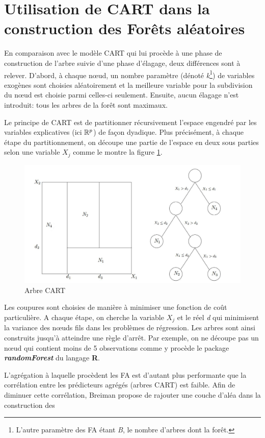 \section{Utilisation de CART dans la construction des Forêts aléatoires}
En comparaison avec le modèle CART qui lui procède à une phase de construction de l'arbre suivie d'une phase d'élagage, deux différences sont à relever. D'abord, à chaque nœud, un nombre paramètre (dénoté \textit{k}\footnote{L'autre paramètre des FA étant \textit{B}, le nombre d'arbres dont la forêt.}) de variables exogènes sont choisies aléatoirement et la meilleure variable pour la subdivision du nœud est choisie parmi celles-ci seulement. Ensuite, aucun élagage n'est introduit: tous les arbres de la forêt sont maximaux.\par
	Le principe de CART est de partitionner récursivement l’espace engendré par les variables explicatives (ici $\mathbb{R}^p$) de façon dyadique. Plus précisément, à
	chaque étape du partitionnement, on découpe une partie de l’espace en deux sous parties selon une variable $X_j$ comme le montre la figure \ref{fig:CART}.
	\begin{figure}[h]
	    		\centering
	    		\includegraphics[scale=0.35]{Cart}
	    		\caption{Arbre CART}
	    		\label{fig:CART}
	\end{figure}
	\par
	Les coupures sont choisies de manière à minimiser une fonction de coût particulière. A chaque étape, on cherche la variable $X_j$ et le réel \textit{d} qui minimisent la variance des nœuds fils dans les problèmes de régression. Les arbres sont ainsi construits jusqu’à atteindre une règle d’arrêt. Par exemple, on ne découpe pas un nœud qui contient moins de 5 observations comme y procède le package \textbf{\textit{randomForest}} du langage \textbf{R}.\par
	L'agrégation à laquelle procèdent les FA est d’autant plus performante que la corrélation entre les prédicteurs agrégés  (arbres CART) est faible. Afin de diminuer cette corrélation, Breiman\cite{BREI01} propose de rajouter une couche d’aléa dans la construction des
